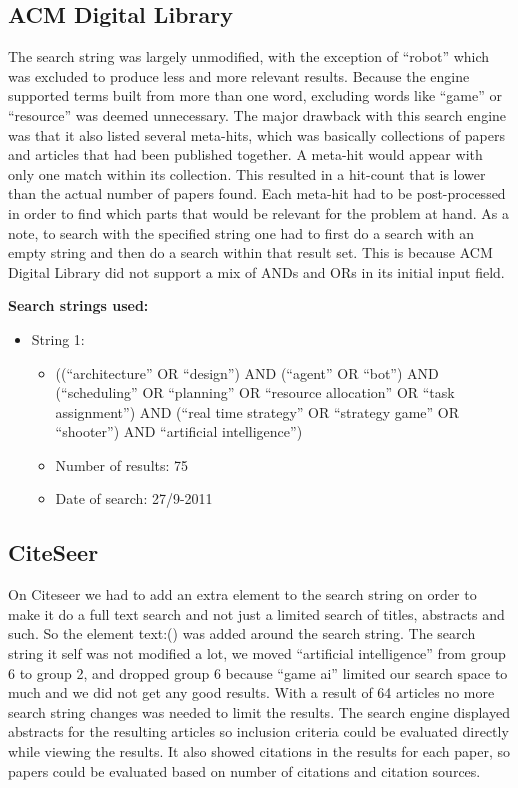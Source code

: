 \subsection{ACM Digital Library}
\label{sub:acm_digital_library}
The search string was largely unmodified, with the exception of ``robot'' which was excluded to produce less and more relevant results. Because the engine supported terms built from more than one word, excluding words like ``game'' or ``resource'' was deemed unnecessary. The major drawback with this search engine was that it also listed several meta-hits, which was basically collections of papers and articles that had been published together. A meta-hit would appear with only one match within its collection. This resulted in a hit-count that is lower than the actual number of papers found. Each meta-hit had to be post-processed in order to find which parts that would be relevant for the problem at hand. As a note, to search with the specified string one had to first do a search with an empty string and then do a search within that result set. This is because ACM Digital Library did not support a mix of ANDs and ORs in its initial input field.

\textbf{Search strings used:}
\begin{itemize}
\item String 1:
\begin{itemize}
\item ((``architecture'' OR ``design'') AND (``agent'' OR ``bot'') AND (``scheduling'' OR ``planning'' OR ``resource allocation'' OR ``task assignment'') AND (``real time strategy'' OR ``strategy game'' OR ``shooter'') AND ``artificial intelligence'')
\item Number of results: 75
\item Date of search: 27/9-2011
\end{itemize}
\end{itemize}

\subsection{CiteSeer}
\label{sub:citeseer}
On Citeseer we had to add an extra element to the search string on order to make it do a full text search and not just a limited search of titles, abstracts and such. So the element text:() was added around the search string. The search string it self was not modified a lot, we moved ``artificial intelligence'' from group 6 to group 2, and dropped group 6 because ``game ai'' limited our search space to much and we did not get any good results.  With a result of 64 articles no more search string changes was needed to limit the results. 
The search engine displayed abstracts for the resulting articles so inclusion criteria could be evaluated directly while viewing the results. It also showed citations in the results for each paper, so papers could be evaluated based on number of citations and citation sources. 

